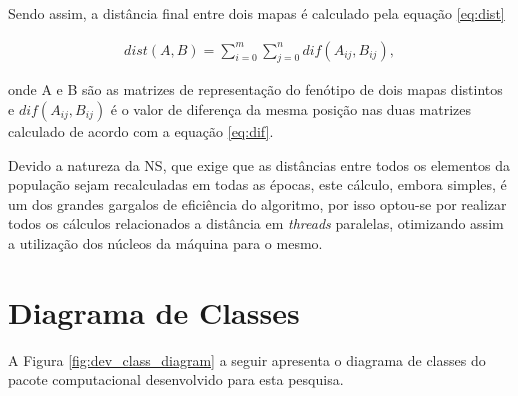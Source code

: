 Sendo assim, a distância final entre dois mapas é calculado pela equação \ref{eq:dist}

\begin{equation}
    \begin{aligned}
        dist(A,B) = \sum_{i=0}^m\sum_{j=0}^ndif(A_{ij}, B_{ij}),
    \end{aligned}
    \label{eq:dist}
\end{equation}

\noindent onde A e B são as matrizes de representação do fenótipo de dois mapas distintos e $dif(A_{ij}, B_{ij})$ é o valor de diferença da mesma posição nas duas matrizes calculado de acordo com a equação \ref{eq:dif}.

Devido a natureza da NS, que exige que as distâncias entre todos os elementos da população sejam recalculadas em todas as épocas, este cálculo, embora simples, é um dos grandes gargalos de eficiência do algoritmo, por isso optou-se por realizar todos os cálculos relacionados a distância em \emph{threads} paralelas, otimizando assim a utilização dos núcleos da máquina para o mesmo.

\section{Diagrama de Classes}

A Figura \ref{fig:dev_class_diagram} a seguir apresenta o diagrama de classes do pacote computacional desenvolvido para esta pesquisa.

